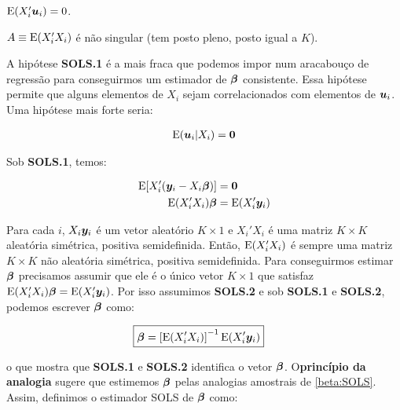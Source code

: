 \documentclass[11pt, oneside, a4paper, article]{article}
\numberwithin{equation}{section}
\begin{document}
\begin{description}[itemsep = 0ex]
\item [SOLS.1] $\text{E}(X_{i}' \boldsymbol{u}_{i}) = 0$.
		
\item [SOLS.2] $A \equiv \text{E}( X_{i}' X_{i} )$ é não singular (tem posto pleno, posto igual a $K$). 
\end{description}

A hipótese \textbf{SOLS.1} é a mais fraca que podemos impor num aracabouço de regressão para conseguirmos um estimador de $\boldsymbol{\beta}$ consistente.
Essa hipótese permite que alguns elementos de $X_{i}$ sejam correlacionados com elementos de $\boldsymbol{u}_{i}$.
Uma hipótese mais forte seria:

\vspace{-1 em}
\begin{align} \label{cond:mean:0}
	\text{E}(\boldsymbol{u}_{i} | X_{i} ) = \boldsymbol{0}
\end{align}

Sob \textbf{SOLS.1}, temos:

\vspace{-1 em}
\begin{align*} 
\text{E}[ X_{i}' ( \boldsymbol{y}_{i} - X_{i} \boldsymbol{\beta} ) ] &= \boldsymbol{0}
\\
\text{E}( X_{i}' X_{i} ) \boldsymbol{\beta} &= \text{E}( X_{i}' \boldsymbol{y}_{i} )  
\end{align*}

Para cada $i$, $X_{i} \boldsymbol{y}_{i}$ é um vetor aleatório $K \times 1$ e $X_{i}'X_{i}$ é uma matriz $K \times K$ aleatória simétrica, positiva semidefinida.
Então, $\text{E}(X_{i}' X_{i})$ é sempre uma matriz $K \times K$ não aleatória simétrica, positiva semidefinida.
Para conseguirmos estimar $\boldsymbol{\beta}$ precisamos assumir que ele é o único vetor $K \times 1$ que satisfaz $\text{E}( X_{i}' X_{i} ) \boldsymbol{\beta} = \text{E}( X_{i}' \boldsymbol{y}_{i} )$.
Por isso assumimos \textbf{SOLS.2} e sob \textbf{SOLS.1} e \textbf{SOLS.2}, podemos escrever $\boldsymbol{\beta}$ como:

\vspace{-1 em}
\begin{align} \label{beta:SOLS}
	\Aboxed{
\betavec &=
\left[ \E( X_{i}' X_{i} )  \right]^{-1}
\E( X_{i}' \mbs{y}_{i} )  }
\end{align}

\noindent
o que mostra que \textbf{SOLS.1} e \textbf{SOLS.2} identifica o vetor $\boldsymbol{\beta}$.
O\textbf{princípio da analogia} sugere que estimemos $\boldsymbol{\beta}$ pelas analogias amostrais de \eqref{beta:SOLS}.
Assim, definimos o estimador SOLS de $\boldsymbol{\beta}$ como:
\end{document}
